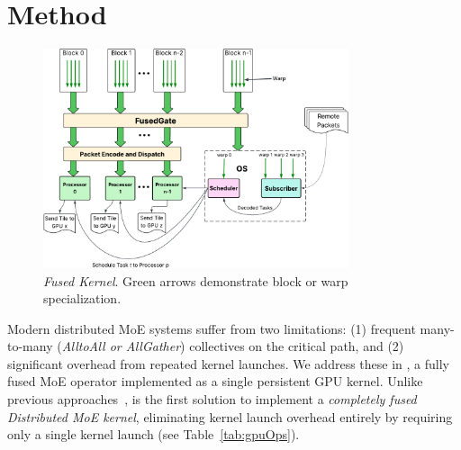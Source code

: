 \chapter{Method}\label{ch:method}
\begin{figure}[!ht]
    \centering
    \includegraphics[width=0.8\textwidth, keepaspectratio]{figures/architecture}
    \caption{\emph{\sysname Fused Kernel}. Green arrows demonstrate block or warp specialization.}
    \label{fig:fusedK}
\end{figure}
Modern distributed MoE systems suffer from two limitations: (1) frequent many-to-many
(\emph{AlltoAll or AllGather}) collectives on the critical path, and
(2) significant overhead from repeated kernel launches.
We address these in \sysname, a fully fused MoE operator implemented
as a single persistent GPU kernel.
Unlike previous approaches~\cite{comet, deepep, pmlr-v162-rajbhandari22a, megatron, MLSYS2023_5616d34c,
    MLSYS2024_339caf45, 10.1145/3503221.3508418, 10.1145/3588964, 10.1145/3627703.3650083, 10.1145/3710848.3710868,
    NEURIPS2022_67d57c32},
\sysname is the first solution to implement a \emph{completely fused Distributed MoE kernel},
eliminating kernel launch overhead entirely by requiring only a single kernel launch (see Table~\ref{tab:gpuOps}).


